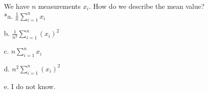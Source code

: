 
We have \(n\) measurements \(x_{i}\). How do we describe the
mean value?\\

*a. \(\frac{1}{n}\sum_{i=1}^{n}x_{i}\)

b. \(\frac{1}{n^{2}}\sum_{i=1}^{n}\left({x}_{i}\right)^{2}\)

c. \(n\sum_{i=1}^{n}x_{i}\)

d. \(n^{2}\sum_{i=1}^{n}\left({x}_{i}\right)^{2}\)

e. I do not know.\\

